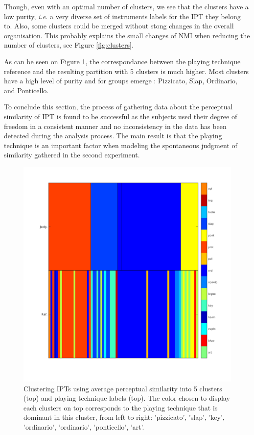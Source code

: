 \documentclass{article}
\newcommand{\ipt}{IPT\xspace}
\newcommand{\ipts}{IPTs\xspace}
\begin{document}
Though, even with an optimal number of clusters, we see that the clusters have  a low purity, \textit{i.e.} a very diverse set of instruments labels for the \ipt they belong to. Also, some clusters could be merged without stong changes in the overall organisation. This probably explains the small changes of NMI when reducing the number of clusters, see Figure \ref{fig:clusters}.

As can be seen on Figure \ref{fig:gm}, the correspondance between the playing technique reference and the resulting partition with 5 clusters is much higher. Most clusters have a high level of purity and for groups emerge : Pizzicato, Slap, Ordinario, and Ponticello.

To conclude this section, the process of gathering data about the perceptual similarity of \ipt is found to be successful as the subjects used their degree of freedom in a consistent manner and no inconsistency in the data has been detected during the analysis process. The main result is that the playing technique is an important factor when modeling the spontaneous judgment of similarity gathered in the second experiment.


\begin{figure}
\center
\includegraphics[width = \textwidth]{figures/groupModes.png}
\caption{Clustering \ipts using average perceptual similarity into 5 clusters (top) and playing technique labels (top). The color chosen to display each clusters on top corresponds to the playing technique that is dominant in this cluster, from left to right: 'pizzicato', 'slap', 'key', 'ordinario', 'ordinario', 'ponticello', 'art'.}
\label{fig:gm}
\end{figure}
\end{document}
